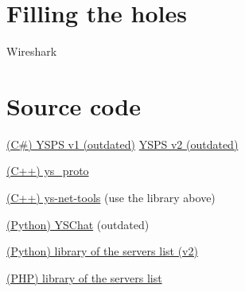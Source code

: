 \documentclass{article}
\begin{document}
\section{Filling the holes}

Wireshark

\section{Source code}


\href{http://marcjeanmougin.free.fr/ys\_servers/fps_z6reg4z6g73qehyns28z5fyi5/Projects/MonoYSPS/}{(C\#) YSPS  v1 (outdated)} \href{http://marcjeanmougin.free.fr/ys\_servers/fps_z6reg4z6g73qehyns28z5fyi5/Projects/fps/}{YSPS v2 (outdated)}

\href{https://bitbucket.org/vincentweb/ys\_proto/src}{(C++) ys\_proto}

\href{https://github.com/vins31/ys-net-tools}{(C++) ys-net-tools} (use the library above)

\href{http://www.yspilots.com/shadowhunters/index.php?page=yschat.php}{(Python) YSChat} (outdated)

\href{https://bitbucket.org/vincentweb/ysf/src/}{(Python) library of the servers list (v2)}

\href{http://pastebin.com/2TFqyjpU}{(PHP) library of the servers list}
\end{document}
